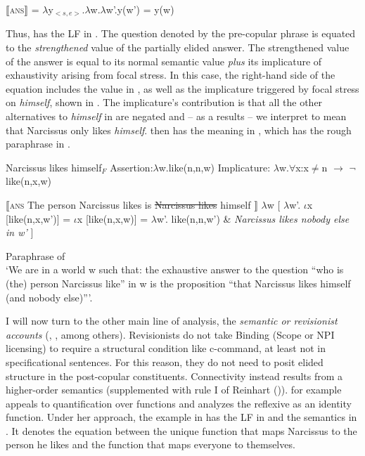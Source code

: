 \documentclass[output=paper,colorlinks,citecolor=brown,draft,draftmode]{langscibook}
\begin{document}
\ea \label{anssem} $\llbracket$\textsc{ans}$\rrbracket$ = $\lambda$y$_{<s,e>}$.$\lambda$w.$\lambda$w'.y(w') = y(w)
\z



Thus,  has the LF in .
The question denoted by the pre-copular phrase is equated to the \textit{strengthened} value of the partially elided answer. The strengthened value of the answer is equal to its normal semantic value  \textit{plus} its implicature of exhaustivity arising from focal stress. In this case, the right-hand side of the equation includes the value in , as well as the implicature triggered by focal stress on  \textit{himself}, shown in . The implicature's contribution is that all the other alternatives to \textit{himself} in  are negated and -- as a results -- we interpret  to mean that Narcissus only likes \textit{himself}.
 then has the meaning in , which has the rough paraphrase in . %

\ea \ea \label{whatever}Narcissus likes himself$_F$
\ex \label{normalvalue1}Assertion:$\lambda$w.like(n,n,w)
\ex\label{implicature1}Implicature: $\lambda$w.$\forall$x:x$\neq$n $\rightarrow$ $\neg$like(n,x,w)
\z
\z

\ea \ea \label{conrelativaLF}$\llbracket$\textsc{ans} The person Narcissus likes is \sout{Narcissus likes} himself $\rrbracket$
\ex \label{conrelativameaning} $\lambda$w [ $\lambda$w'. $\iota$x [like(n,x,w')] = $\iota$x [like(n,x,w)] = $\lambda$w'. like(n,n,w') \& \textit{Narcissus likes nobody else in w'} ]
\z
\z

\ea \label{paraphrase} Paraphrase of \\
\glt `We are in a world w such that: the exhaustive answer to the question ``who is (the) person Narcissus like'' in w is the proposition ``that Narcissus likes himself (and nobody else)'''.

\nocite{groenendijk1984}
\z

I will now turn to the other main line of analysis, the \textit{semantic or revisionist accounts}  (\cite{jacobson1994connectivitysalt}, \cite{sharvit1999connectivity}, \cite{cecchetto2000connectivity} among others).
Revisionists do not take Binding (Scope or NPI licensing) to require a structural condition like c-command, at least not in specificational sentences. For this reason, they do not need to posit elided structure in the post-copular constituents.
Connectivity instead results from a higher-order semantics (supplemented with rule I of Reinhart (\citeyear{reinhart1983})).
\citet{sharvit1999connectivity} for example appeals to quantification over functions and analyzes the reflexive as an identity function. Under her approach, the example in  has the LF in  and the semantics in . It denotes the equation between the unique function that maps Narcissus to the person he likes and the function that maps everyone to themselves.%
\end{document}
